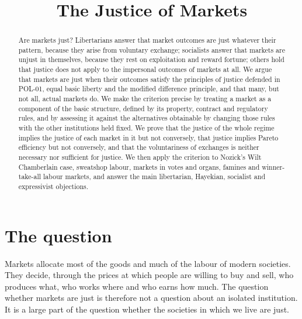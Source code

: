 \documentclass{situationist-preprint}
\title{The Justice of Markets}
\begin{document}
\maketitle

\begin{abstract}
Are markets just? Libertarians answer that market outcomes are just whatever their pattern, because they arise from voluntary exchange; socialists answer that markets are unjust in themselves, because they rest on exploitation and reward fortune; others hold that justice does not apply to the impersonal outcomes of markets at all. We argue that markets are just when their outcomes satisfy the principles of justice defended in POL-01, equal basic liberty and the modified difference principle, and that many, but not all, actual markets do. We make the criterion precise by treating a market as a component of the basic structure, defined by its property, contract and regulatory rules, and by assessing it against the alternatives obtainable by changing those rules with the other institutions held fixed. We prove that the justice of the whole regime implies the justice of each market in it but not conversely, that justice implies Pareto efficiency but not conversely, and that the voluntariness of exchanges is neither necessary nor sufficient for justice. We then apply the criterion to Nozick's Wilt Chamberlain case, sweatshop labour, markets in votes and organs, famines and winner-take-all labour markets, and answer the main libertarian, Hayekian, socialist and expressivist objections.
\end{abstract}

\section{The question}

Markets allocate most of the goods and much of the labour of modern societies. They decide, through the prices at which people are willing to buy and sell, who produces what, who works where and who earns how much. The question whether markets are just is therefore not a question about an isolated institution. It is a large part of the question whether the societies in which we live are just.
\end{document}
